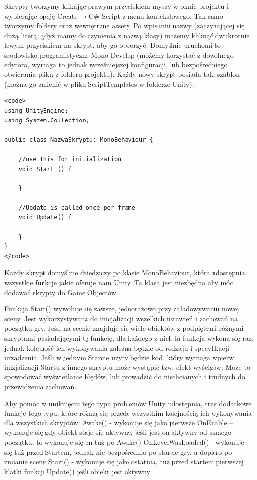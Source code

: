 \documentclass[brudnopis]{xmgr}
\begin{document}
Skrypty tworzymy klikając prawym przyciskiem myszy w oknie projektu i wybierając opcję  Create    → C\# Script z menu kontekstowego. Tak samo tworzymy foldery oraz wewnętrzne assety. Po wpisaniu nazwy (zaczynającej się dużą literą, gdyż mamy do czynienia z nazwą klasy) możemy kliknąć dwukrotnie lewym przyciskiem na skrypt, aby go otworzyć. Domyślnie uruchomi to środowisko programistyczne Mono Develop (możemy korzystać z dowolnego edytora, wymaga to jednak wcześniejszej konfiguracji, lub bezpośredniego otwierania pliku z folderu projektu). Każdy nowy skrypt posiada taki szablon (można go zmienić w pliku ScriptTemplates w folderze Unity):

\begin{lstlisting}
<code>
using UnityEngine;
using System.Collection;

public class NazwaSkryptu: MonoBehaviour {

	//use this for initialization
	void Start () {

	}

	//Update is called once per frame
	void Update() {

	}
} 
</code>
\end{lstlisting}

Każdy skrypt domyślnie dziedziczy po klasie MonoBehaviour, która  udostępnia wszystkie funkcje jakie oferuje nam Unity. Ta klasa jest niezbędna aby móc dodawać skrypty do Game Objectów.

Funkcja Start() wywołuje się zawsze, jednorazowo przy załadowywaniu nowej sceny. Jest wykorzystywana do inicjalizacji wszelkich ustawień i zachowań na początku gry. Jeśli na scenie znajduje się wiele obiektów z podpiętymi różnymi skryptami posiadającymi tę funkcję, dla każdego  z nich ta funkcja wykona się raz, jednak kolejność ich wykonywania zależna będzie od rodzaju i specyfikacji urządzenia. Jeśli w jednym Starcie użyty będzie kod, który wymaga wpierw inizjalizacji Startu z innego skryptu może wystąpić tzw. efekt wyścigów. Może to spowodować wyświetlanie błędów, lub prowadzić do niechcianych i trudnych do przewidzenia zachowań.

Aby pomóc w uniknięciu tego typu problemów Unity udostępnia, trzy dodatkowe funkcje tego typu, które różnią się przede wszystkim kolejnością ich wykonywania dla wszystkich skryptów:
Awake() - wykonuje się jako pierwsze
OnEnable – wykonuje się gdy obiekt staje się aktywny, jeśli jest on aktywny od samego początku, to wykonuje się on tuż po Awake()
OnLevelWasLoaded() - wykonuje się tuż przed Startem, jednak nie bezpośrednio po starcie gry, a dopiero po zmianie sceny
Start() - wykonuje się jako ostatnia, tuż przed startem pierwszej klatki funkcji Update() jeśli obiekt jest aktywny
\end{document}

